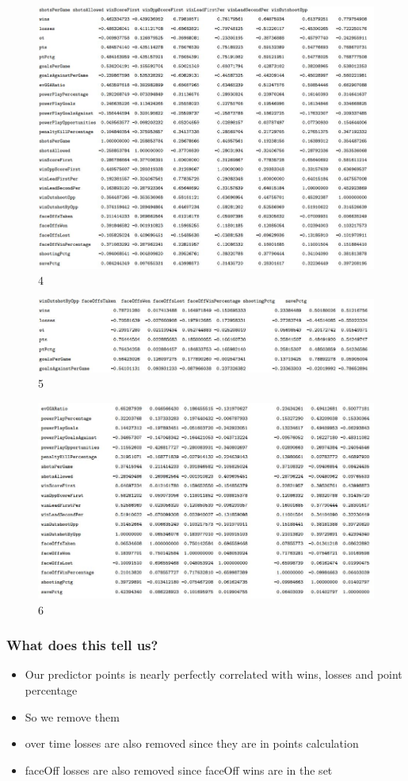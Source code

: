 \documentclass{beamer}
\begin{document}
\begin{frame}
\begin{figure}
	\centering
	\includegraphics[width=0.7\linewidth]{"Correlation Matrix 4"}
	\caption{4}
	\label{fig:correlation-matrix-4}
\end{figure}
\end{frame}
\begin{frame}
\begin{figure}
	\centering
	\includegraphics[width=0.7\linewidth]{"Correlation Matrix 5"}
	\caption{5}
	\label{fig:correlation-matrix-5}
\end{figure}
\end{frame}
\begin{frame}
\begin{figure}
	\centering
	\includegraphics[width=0.7\linewidth]{"Correlation Matrix 6"}
	\caption{6}
	\label{fig:correlation-matrix-6}
\end{figure}
\end{frame}
\begin{frame}
	\frametitle{What does this tell us?}
	\begin{itemize}
		\item Our predictor points is nearly perfectly correlated with wins, losses and point percentage
		\item So we remove them
		\item over time losses are also removed since they are in points calculation
		\item faceOff losses are also removed since faceOff wins are in the set
	\end{itemize}
\end{frame}
\end{document}
